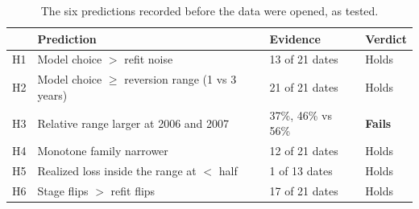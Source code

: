 \begin{table}[t]\centering\small
\caption{The six predictions recorded before the data were opened, as tested.}\label{tab:hyp}
\begin{tabular}{llll}\toprule
& Prediction & Evidence & Verdict \\ \midrule
H1 & Model choice $>$ refit noise & 13 of 21 dates & Holds \\
H2 & Model choice $\ge$ reversion range (1 vs 3 years) & 21 of 21 dates & Holds \\
H3 & Relative range larger at 2006 and 2007 & 37\%, 46\% vs 56\% & \textbf{Fails} \\
H4 & Monotone family narrower & 12 of 21 dates & Holds \\
H5 & Realized loss inside the range at $<$ half & 1 of 13 dates & Holds \\
H6 & Stage flips $>$ refit flips & 17 of 21 dates & Holds \\
\bottomrule\end{tabular}
\end{table}
